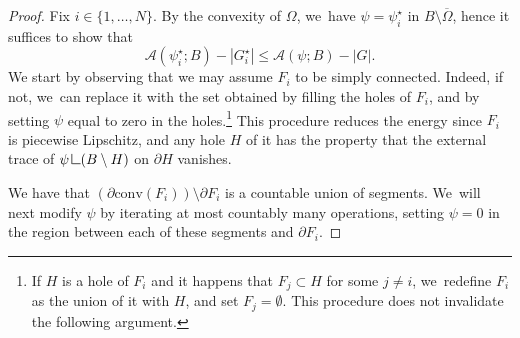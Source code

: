 \documentclass[JEP,XML,SOM,Unicode, NoFloatCountersInSection,published]{cedram}
\newcommand{\resa}{\mathop{\hbox{\vrule height 7pt width 0.5pt depth 0pt
\vrule height 0.5pt width 6pt depth 0pt}}\nolimits}
\newcommand{\resb}{\mathop{\hbox{\vrule height 4pt width 0.5pt depth 0pt
\vrule height 0.5pt width 3pt depth 0pt}}\nolimits}
\newcommand{\res}{\mathchoice{\resa}{\resa}{\resb}{\resb}}
\theoremstyle{definition}
\begin{document}
\begin{proof}
Fix $i\in\{1,\dots,N\}$.
By the convexity of $\Omega$, we~have $\psi=\psi_i^\star$ in $B\setminus \overline\Omega$, hence it suffices to show that
\begin{equation*}
\mathcal A(\psi_i^\star;B)-|G_i^\star|\leq\mathcal A(\psi;B)-|G|.
\end{equation*}
We start by observing that we may assume $F_i$ to be simply connected.
Indeed, if not, we~can replace it with the set obtained by filling the
holes of $F_i$, and by setting $\psi$ equal to zero in the holes.\footnote{If $H$ is a hole of $F_i$ and it happens that $F_j\subset H$ for some $j\neq i$, we~redefine $F_i$ as the union of it with $H$, and set $F_j=\emptyset$. This procedure does not invalidate the following argument.}
This procedure reduces the energy since $F_i$ is piecewise Lipschitz, and any hole $H$ of
it has the property that
the external trace of $\psi\res (B\setminus H)$ on $\partial H$ vanishes.

We have that $(\partial \mathrm{conv}(F_i))\setminus\partial F_i$ is a countable union of segments. We~will next modify $\psi$ by iterating at most countably many operations, setting $\psi=0$ in the region between each of these segments and $\partial F_i$.


\end{proof}
\end{document}
